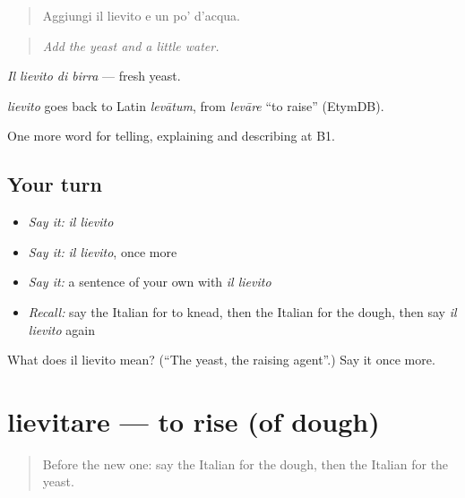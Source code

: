 \begin{quote}
Aggiungi il lievito e un po' d'acqua.
\end{quote}

\begin{quote}
\emph{Add the yeast and a little water.}
\end{quote}

\emph{Il lievito di birra} — fresh yeast.

\begin{cousinweb}
\emph{lievito} goes back to Latin \emph{levātum}, from \emph{levāre} \textquotedblleft{}to raise\textquotedblright{} (EtymDB).
\end{cousinweb}

\begin{grammarlens}[title={What you've built}]
One more word for telling, explaining and describing at B1.
\end{grammarlens}

\subsection*{Your turn}
\begin{itemize}
\raggedright
  \item \emph{Say it:} \emph{il lievito}
  \item \emph{Say it:} \emph{il lievito}, once more
  \item \emph{Say it:} a sentence of your own with \emph{il lievito}
  \item \emph{Recall:} say the Italian for to knead, then the Italian for the dough, then say \emph{il lievito} again
\end{itemize}

\begin{tcolorbox}[breakable,colback=teal!4,colframe=teal!35!black,title={Before you move on}]
What does il lievito mean? (\textquotedblleft{}The yeast, the raising agent\textquotedblright{}.) Say it once more.
\end{tcolorbox}
\section[lievitare]{lievitare — to rise (of dough)}

\label{lesson:IT-C335-lievitare}



\begin{quote}
Before the new one: say the Italian for the dough, then the Italian for the yeast.
\end{quote}

